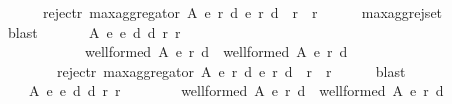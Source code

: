 \begin{isabellebody}
\ \ \ \ \ \ reject{\isacharunderscore}{\kern0pt}r\ {\isacharparenleft}{\kern0pt}max{\isacharunderscore}{\kern0pt}aggregator\ A\ {\isacharparenleft}{\kern0pt}e{}{\isacharcomma}{\kern0pt}\ r{}{\isacharcomma}{\kern0pt}\ d{}{\isacharparenright}{\kern0pt}\ {\isacharparenleft}{\kern0pt}e{}{\isacharcomma}{\kern0pt}\ r{}{\isacharcomma}{\kern0pt}\ d{}{\isacharparenright}{\kern0pt}{\isacharparenright}{\kern0pt}\ {\isacharequal}{\kern0pt}\ r{}\ {\isasyminter}\ r{}{\isachardoublequoteclose}\isanewline
\ \ \ \ \isamarkupfalse%
\ max{\isacharunderscore}{\kern0pt}agg{\isacharunderscore}{\kern0pt}rej{\isacharunderscore}{\kern0pt}set\isanewline
\ \ \ \ \isamarkupfalse%
\ blast\isanewline
\ \ \isamarkupfalse%
\isanewline
\ \ \ \ {\isachardoublequoteopen}{\isasymforall}A\ e{}\ e{}\ d{}\ d{}\ r{}\ r{}{\isachardot}{\kern0pt}\isanewline
\ \ \ \ \ \ \ \ \ \ \ \ {\isacharparenleft}{\kern0pt}well{\isacharunderscore}{\kern0pt}formed\ A\ {\isacharparenleft}{\kern0pt}e{}{\isacharcomma}{\kern0pt}\ r{}{\isacharcomma}{\kern0pt}\ d{}{\isacharparenright}{\kern0pt}\ {\isasymand}\ well{\isacharunderscore}{\kern0pt}formed\ A\ {\isacharparenleft}{\kern0pt}e{}{\isacharcomma}{\kern0pt}\ r{}{\isacharcomma}{\kern0pt}\ d{}{\isacharparenright}{\kern0pt}{\isacharparenright}{\kern0pt}\ {\isasymlongrightarrow}\isanewline
\ \ \ \ \ \ \ \ reject{\isacharunderscore}{\kern0pt}r\ {\isacharparenleft}{\kern0pt}max{\isacharunderscore}{\kern0pt}aggregator\ A\ {\isacharparenleft}{\kern0pt}e{}{\isacharcomma}{\kern0pt}\ r{}{\isacharcomma}{\kern0pt}\ d{}{\isacharparenright}{\kern0pt}\ {\isacharparenleft}{\kern0pt}e{}{\isacharcomma}{\kern0pt}\ r{}{\isacharcomma}{\kern0pt}\ d{}{\isacharparenright}{\kern0pt}{\isacharparenright}{\kern0pt}\ {\isasymsubseteq}\ r{}\ {\isasyminter}\ r{}{\isachardoublequoteclose}\isanewline
\ \ \ \ \isamarkupfalse%
\ blast\isanewline
\ \ \isamarkupfalse%
\ \isamarkupfalse%
\isanewline
\ \ \ \ {\isachardoublequoteopen}{\isasymforall}A\ e{}\ e{}\ d{}\ d{}\ r{}\ r{}{\isachardot}{\kern0pt}\isanewline
\ \ \ \ \ \ \ \ {\isacharparenleft}{\kern0pt}well{\isacharunderscore}{\kern0pt}formed\ A\ {\isacharparenleft}{\kern0pt}e{}{\isacharcomma}{\kern0pt}\ r{}{\isacharcomma}{\kern0pt}\ d{}{\isacharparenright}{\kern0pt}\ {\isasymand}\ well{\isacharunderscore}{\kern0pt}formed\ A\ {\isacharparenleft}{\kern0pt}e{}{\isacharcomma}{\kern0pt}\ r{}{\isacharcomma}{\kern0pt}\ d{}{\isacharparenright}{\kern0pt}{\isacharparenright}{\kern0pt}\ {\isasymlongrightarrow}\isanewline

\end{isabellebody}
